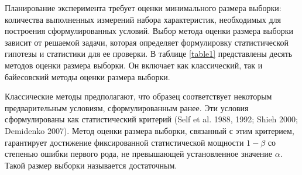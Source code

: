 Планирование эксперимента требует оценки минимального размера выборки: количества выполненных измерений набора характеристик, необходимых для построения сформулированных условий. Выбор метода оценки размера выборки зависит от решаемой задачи, которая определяет формулировку статистической гипотезы и статистики для ее проверки. В таблице \ref{table1} представлены десять методов оценки размера выборки. Он включает как классический, так и байесовский методы оценки размера выборки.

Классические методы предполагают, что образец соответствует некоторым предварительным условиям, сформулированным ранее. Эти условия сформулированы как статистический критерий (Self et al. 1988, 1992; Shieh 2000; Demidenko 2007). Метод оценки размера выборки, связанный с этим критерием, гарантирует достижение фиксированной статистической мощности $1-\beta$ со степенью ошибки первого рода, не превышающей установленное значение $\alpha$. Такой размер выборки называется достаточным.

